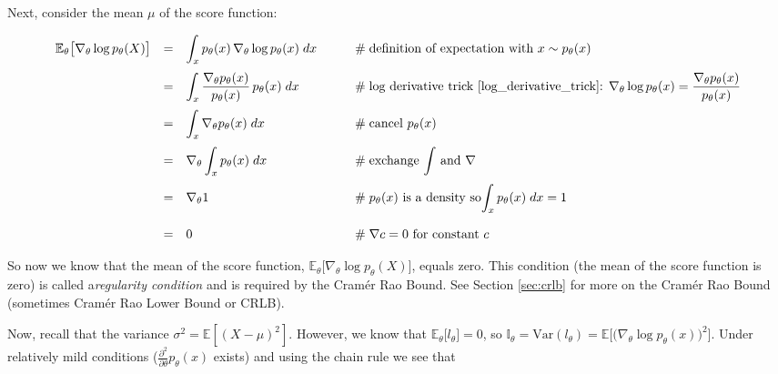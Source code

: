 \documentclass{article}
\theoremstyle{definition}
\begin{document}
\bigskip
\noindent
Next, consider the mean $\mu$ of the score function:


\begin{equation*}
\begin{array}{llll}
\mathbb{E}_{\theta}\big [ \nabla_{\theta} \log p_{\theta}(X) \big] 
&=& {\displaystyle \int_{x} p_{\theta}(x) \, \nabla_{\theta} \log p_{\theta}(x) \; dx}
		&\qquad \mathrel{\#} \text{definition of expectation with $x \sim p_{\theta}(x)$} \\ 
[12pt]
&=& {\displaystyle \int_{x} \frac{\nabla_\theta p_\theta(x)}{p_\theta(x)} \, p_\theta(x) \; dx} 
		&\qquad \mathrel{\#} \text{log derivative trick \cite{log_derivative_trick}: } 
									\nabla_{\theta} \log p_{\theta}(x) = 
		                            \dfrac{\nabla_{\theta} p_\theta(x)}{p_\theta(x)} \\ 
[12pt]
&=& {\displaystyle \int_{x} \nabla_\theta p_\theta(x) \; dx} 
		&\qquad \mathrel{\#} \text{cancel $p_\theta(x)$}\\ 
[12pt]
&=& {\displaystyle \nabla_\theta \int_{x} p_\theta(x) \; dx} 
		&\qquad \mathrel{\#} \text{exchange ${\displaystyle \int}$ and $\nabla$} \\ 
[12pt]
&=& \nabla_{\theta} 1 
		&\qquad \mathrel{\#} \text{$p_\theta(x)$ is a density so} 
		                                 {\displaystyle \int_{x} p_\theta(x) \; dx = 1} \\ 
[17pt]
&=& 0 
		&\qquad \mathrel{\#} \nabla c = 0 \text{ for constant $c$}
\end{array}
\end{equation*}

\bigskip
\noindent
So now we know that the mean of the score function,
$\mathbb{E}_{\theta}\big[\nabla_{\theta} \log p_{\theta}(X)\big]$,
equals zero. This condition (the mean of the score function is zero) 
is called a\emph{regularity condition} and is required by the 
Cram\'er Rao Bound. See Section \ref{sec:crlb} for more on the 
Cram\'er Rao Bound (sometimes Cram\'er Rao Lower Bound or CRLB).

\bigskip
\noindent
Now, recall that the variance $\sigma^2 = \mathbb{E}[(X -
\mu)^2]$. However, we know that $\mathbb{E}_{\theta}\big
[l_\theta\big] = 0$, so $\mathbb{I}_\theta = \text{Var}(l_\theta)
= \mathbb{E} \big [\big (\nabla_\theta \log p_\theta(x)\big)^2
\big ]$. Under relatively mild conditions
($\frac{\partial^2}{\partial {\theta}} p_\theta(x)$ exists) and
using the chain rule we see that
\end{document}
